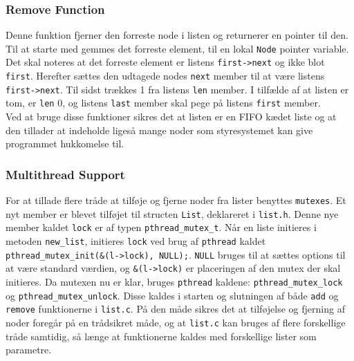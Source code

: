 \subsubsection{Remove Function}
Denne funktion fjerner den forreste node i listen og returnerer en pointer til den. Til at starte med gemmes det forreste element, til en lokal \texttt{Node} pointer variable. Det skal noteres at det forreste element er listens \texttt{first->next} og ikke blot \texttt{first}. Herefter sættes den udtagede nodes \texttt{next} member til at være listens \texttt{first->next}. Til sidst trækkes 1 fra listens \texttt{len} member. I tilfælde af at listen er tom, er \texttt{len} 0, og listens \texttt{last} member skal pege på listens \texttt{first} member. \\

Ved at bruge disse funktioner sikres det at listen er en FIFO kædet liste og at den tillader at indeholde ligeså mange noder som styresystemet kan give programmet hukkomelse til. 

\subsubsection{Multithread Support}
For at tillade flere tråde at tilføje og fjerne noder fra lister benyttes \texttt{mutexes}. Et nyt member er blevet tilføjet til structen \texttt{List}, deklareret i \texttt{list.h}. Denne nye member kaldet \texttt{lock} er af typen \texttt{pthread\_mutex\_t}. Når en liste initieres i metoden \texttt{new\_list}, initieres \texttt{lock} ved brug af \texttt{pthread} kaldet \texttt{pthread\_mutex\_init(\&(l->lock), NULL);}. \texttt{NULL} bruges til at sættes options til at være standard værdien, og \texttt{\&(l->lock)} er placeringen af den mutex der skal initieres. Da mutexen nu er klar, bruges \texttt{pthread} kaldene: \texttt{pthread\_mutex\_lock} og \texttt{pthread\_mutex\_unlock}. Disse kaldes i starten og slutningen af både \texttt{add} og \texttt{remove} funktionerne i \texttt{list.c}. På den måde sikres det at tilføjelse og fjerning af noder foregår på en trådsikret måde, og at \texttt{list.c} kan bruges af flere forskellige tråde samtidig, så længe at funktionerne kaldes med forskellige lister som parametre.

